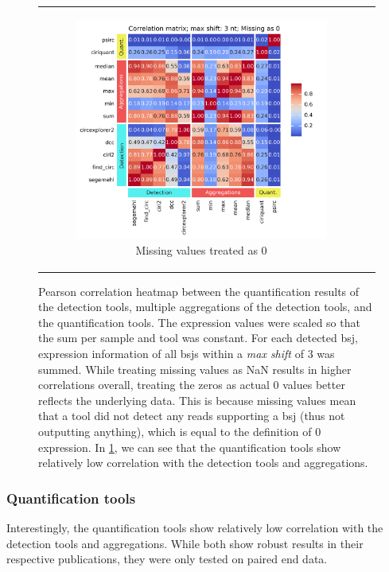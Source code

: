 \begin{figure}[ht]
\begin{tabular}{cc}
\begin{subfigure}{0.5\textwidth}
            \includegraphics[width=\linewidth]{chapters/4_results_and_discussion/figures/quantification/correlation_heatmap_3_0.png}
            \caption{Missing values treated as 0}
            \label{fig:correlation_heatmap_3_0}
        \end{subfigure} \end{tabular} \caption{Pearson correlation heatmap
        between the
        quantification results of the detection tools, multiple aggregations of
        the
        detection tools, and the quantification tools.
        The expression values were scaled so that the sum per sample and tool was
        constant.
        For each detected \gls{bsj}, expression information of all \glspl{bsj} within a
        \textit{max shift} of 3 was summed.
        While treating missing values as NaN results in higher correlations overall,
        treating the zeros as actual 0 values better reflects the underlying data.
        This is because missing values mean that a tool did not detect any reads
        supporting a \gls{bsj} (thus not outputting anything), which is equal to the
        definition of 0 expression.
        In \cref{fig:correlation_heatmap_3_0}, we can see that the quantification tools
        show relatively low correlation with the detection tools and aggregations.
    } \label{fig:correlation_heatmap} \end{figure}

\subsubsection{Quantification tools}
Interestingly, the quantification tools show relatively low correlation with
the detection tools and aggregations.
While both show robust results in their respective publications, they were only
tested on paired end data\supercite{zhang_accurate_2020,yu_quantifying_2021}.

